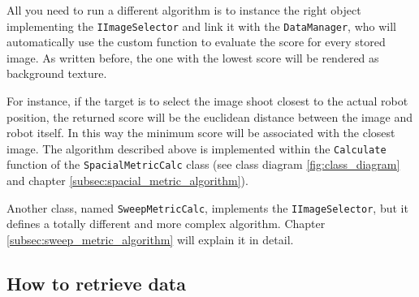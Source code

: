 %
All you need to run a different algorithm is to instance the right object implementing the
\texttt{IImageSelector} and link it with the \texttt{DataManager}, who will automatically
use the custom function to evaluate the score for every stored image. As written before, the
one with the lowest score will be rendered as background texture.
%

%
For instance, if the target is to select the image shoot closest to the actual robot position,
the returned score will be the euclidean distance between the image and robot itself. In this way
the minimum score will be associated with the closest image.
The algorithm described above is implemented within the \texttt{Calculate} function of the
\texttt{SpacialMetricCalc} class (see class diagram \ref{fig:class_diagram} and chapter
\ref{subsec:spacial_metric_algorithm}).
%

%
Another class, named \texttt{SweepMetricCalc}, implements the
\newline
\texttt{IImageSelector}, but it defines a totally different and more complex algorithm.
Chapter \ref{subsec:sweep_metric_algorithm} will explain it in detail.

\subsection{How to retrieve data}
\label{sub:howretrievedata}
